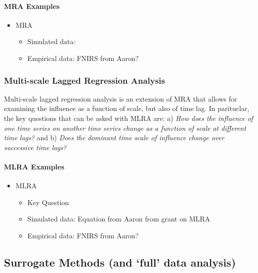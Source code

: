 \documentclass[
  english,
  man]{apa6}
\providecommand{\tightlist}{%
  \setlength{\itemsep}{0pt}\setlength{\parskip}{0pt}}
\let\oldparagraph\paragraph
\renewcommand{\paragraph}[1]{\oldparagraph{#1}\mbox{}}
\begin{document}
\hypertarget{mra-examples}{%
\paragraph{MRA Examples}\label{mra-examples}}

\begin{itemize}
\item
  MRA

  \begin{itemize}
  \tightlist
  \item
    Simulated data:
  \item
    Empirical data: FNIRS from Aaron?
  \end{itemize}
\end{itemize}

\hypertarget{multi-scale-lagged-regression-analysis}{%
\subsubsection{Multi-scale Lagged Regression Analysis}\label{multi-scale-lagged-regression-analysis}}

Multi-scale lagged regression analysis is an extension of MRA that
allows for examining the influence as a function of scale, but also of
time lag. In parituclar, the key questions that can be asked with MLRA
are: a) \emph{How does the influence of one time series on another time
series change as a function of scale at different time lags?} and b)
\emph{Does the dominant time scale of influence change over successive time
lags?}

\hypertarget{mlra-examples}{%
\paragraph{MLRA Examples}\label{mlra-examples}}

\begin{itemize}
\item
  MLRA

  \begin{itemize}
  \tightlist
  \item
    Key Question
  \item
    Simulated data: Equation from Aaron from grant on MLRA
  \item
    Empirical data: FNIRS from Aaron?
  \end{itemize}
\end{itemize}

\hypertarget{surrogate-methods-and-full-data-analysis}{%
\subsection{Surrogate Methods (and `full' data analysis)}\label{surrogate-methods-and-full-data-analysis}}
\end{document}
